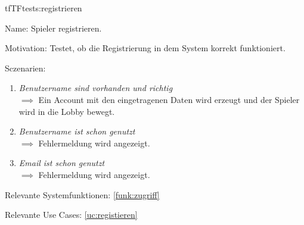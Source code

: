 \begin{description}[leftmargin=5em, style=sameline]

\begin{lhp}{tf}{TF}{tests:registrieren}
	\item [Name:] Spieler registrieren.
	\item [Motivation:] Testet, ob die Registrierung in dem System korrekt funktioniert.
	\item [Sczenarien:] \hfill
		\begin{enumerate}
			\item \textit{Benutzername sind vorhanden und richtig} \\ $\implies$ Ein Account mit den eingetragenen Daten wird erzeugt und der Spieler wird in die Lobby bewegt.
			\item \textit{Benutzername ist schon genutzt} \\ $\implies$ Fehlermeldung wird angezeigt.
			\item \textit{Email ist schon genutzt} \\ $\implies$ Fehlermeldung wird angezeigt.
		\end{enumerate}
	\item [Relevante Systemfunktionen:] \ref{funk:zugriff}
	\item [Relevante Use Cases:] \ref{uc:registieren}
\end{lhp}

\end{description}

